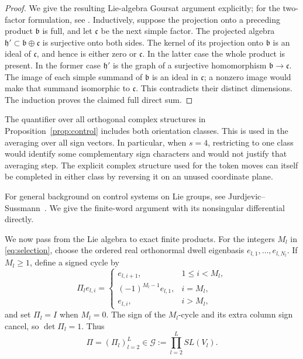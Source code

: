 \begin{proof}
We give the resulting Lie-algebra Goursat argument explicitly; for the
two-factor formulation, see \cite[Section~3]{FigueroaUngureanu2016}.
Inductively,
suppose the projection onto a preceding product \(\mathfrak b\)
is full, and let \(\mathfrak c\) be the next simple factor.
The projected algebra
\(\mathfrak h'\subset\mathfrak b\oplus\mathfrak c\) is surjective
onto both sides.  The kernel of its projection onto \(\mathfrak b\)
is an ideal of \(\mathfrak c\), and hence is either zero or
\(\mathfrak c\).  In the latter case the whole product is present.
In the former case \(\mathfrak h'\) is the graph of a surjective
homomorphism \(\mathfrak b\to\mathfrak c\).
The image of each simple summand of \(\mathfrak b\) is an ideal in
\(\mathfrak c\); a nonzero image would make that summand isomorphic
to \(\mathfrak c\).  This contradicts their distinct dimensions.
The induction proves the claimed full direct sum.
\end{proof}

\begin{remark}
The quantifier over all orthogonal complex structures in
Proposition~\ref{prop:control} includes both orientation classes.
This is used in the averaging over all sign vectors.  In
particular, when \(s=4\), restricting to one class would identify
some complementary sign characters and would not justify that
averaging step.  The explicit complex structure used for the token
moves can itself be completed in either class by reversing it on
an unused coordinate plane.
\end{remark}

For general background on control systems on Lie groups, see
Jurdjevic--Sussmann~\cite{JurdjevicSussmann}.  We give the finite-word
argument with its nonsingular differential directly.

We now pass from the Lie algebra to exact finite products.  For the
integers \(M_l\) in \eqref{eq:selection}, choose the ordered real
orthonormal dwell eigenbasis \(e_{l,1},\ldots,e_{l,N_l}\).
If \(M_l\geq1\), define a signed cycle by
\[
 \Pi_l e_{l,i}=
 \begin{cases}
 e_{l,i+1},&1\leq i<M_l,\\
 (-1)^{M_l-1}e_{l,1},&i=M_l,\\
 e_{l,i},&i>M_l,
 \end{cases}
\]
and set \(\Pi_l=I\) when \(M_l=0\).
The sign of the \(M_l\)-cycle and its extra column sign cancel,
so \(\det\Pi_l=1\).  Thus
\[
 \Pi=(\Pi_l)_{l=2}^L\in
 \mathcal G:=\prod_{l=2}^L SL(V_l).
\]

